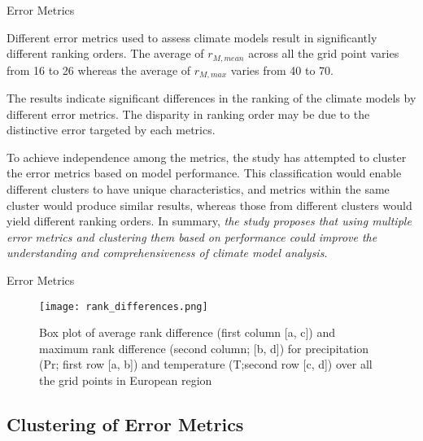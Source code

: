 \documentclass[xcolor={dvipsnames}]{beamer}
\begin{document}
\begin{frame}{Error Metrics}

Different error metrics used to assess climate models result in significantly different ranking orders. The average of $r_{M,mean}$ across all the grid point varies from 16 to 26 whereas the average of $r_{M, max}$ varies from 40 to 70. 

\pause

\hfill

The results indicate significant differences in the ranking of the climate models by different error metrics. The disparity in ranking order may be due to the distinctive error targeted by each metrics.

\pause

\hfill

To achieve independence among the metrics, the study has attempted to cluster the error metrics based on model performance. This classification would enable different clusters to have unique characteristics, and metrics within the same cluster would produce similar results, whereas those from different clusters would yield different ranking orders. In summary, \textit{the study proposes that using multiple error metrics and clustering them based on performance could improve the understanding and comprehensiveness of climate model analysis}.

\end{frame}

\begin{frame}{Error Metrics}

\begin{figure}
    \centering
    \texttt{[image: rank\_differences.png]}
    \setlength{\abovecaptionskip}{0pt}
    \caption*{\tiny{Box plot of average rank difference (first column [a, c]) and maximum rank difference (second column; [b, d]) for precipitation (Pr; first row [a, b]) and temperature (T;second row [c, d]) over all the grid points in European region}}
    \label{fig:rank_differences}
\end{figure}
    
\end{frame}

\subsection{Clustering of Error Metrics}
\end{document}
